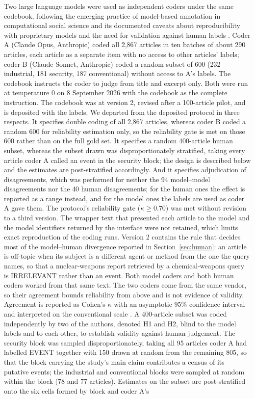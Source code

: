 \documentclass[1p,times]{elsarticle}
\begin{document}
Two large language models were used as independent coders under the same codebook, following the emerging practice of model-based annotation in computational social science \cite{gilardi2023,ziems2024} and its documented caveats about reproducibility with proprietary models \cite{ollion2024} and the need for validation against human labels \cite{pangakis2023}. Coder A (Claude Opus, Anthropic) coded all 2,867 articles in ten batches of about 290 articles, each article as a separate item with no access to other articles' labels; coder B (Claude Sonnet, Anthropic) coded a random subset of 600 (232 industrial, 181 security, 187 conventional) without access to A's labels. The codebook instructs the coder to judge from title and excerpt only. Both were run at temperature 0 on 8 September 2026 with the codebook as the complete instruction. The codebook was at version 2, revised after a 100-article pilot, and is deposited with the labels. We departed from the deposited protocol in three respects. It specifies double coding of all 2,867 articles, whereas coder B coded a random 600 for reliability estimation only, so the reliability gate is met on those 600 rather than on the full gold set. It specifies a random 400-article human subset, whereas the subset drawn was disproportionately stratified, taking every article coder A called an event in the security block; the design is described below and the estimates are post-stratified accordingly. And it specifies adjudication of disagreements, which was performed for neither the 94 model--model disagreements nor the 40 human disagreements; for the human ones the effect is reported as a range instead, and for the model ones the labels are used as coder A gave them. The protocol's reliability gate ($\kappa \ge 0.70$) was met without revision to a third version. The wrapper text that presented each article to the model and the model identifiers returned by the interface were not retained, which limits exact reproduction of the coding runs. Version 2 contains the rule that decides most of the model--human divergence reported in Section~\ref{sec:human}: an article is off-topic when its subject is a different agent or method from the one the query names, so that a nuclear-weapons report retrieved by a chemical-weapons query is IRRELEVANT rather than an event. Both model coders and both human coders worked from that same text. The two coders come from the same vendor, so their agreement bounds reliability from above and is not evidence of validity. Agreement is reported as Cohen's $\kappa$ \cite{cohen1960} with an asymptotic 95\% confidence interval and interpreted on the conventional scale \cite{landis1977,mchugh2012}. A 400-article subset was coded independently by two of the authors, denoted H1 and H2, blind to the model labels and to each other, to establish validity against human judgement. The security block was sampled disproportionately, taking all 95 articles coder A had labelled EVENT together with 150 drawn at random from the remaining 805, so that the block carrying the study's main claim contributes a census of its putative events; the industrial and conventional blocks were sampled at random within the block (78 and 77 articles). Estimates on the subset are post-stratified onto the six cells formed by block and coder A's 
\end{document}
